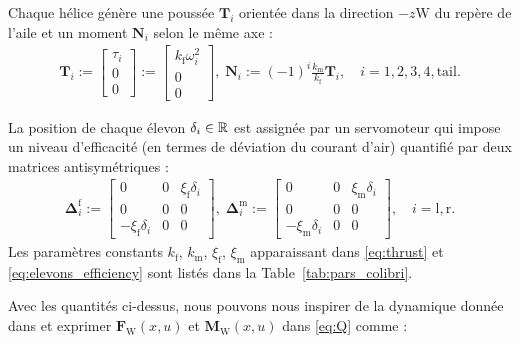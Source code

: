 Chaque hélice génère une poussée $\boldsymbol{T}_i$ orientée dans la direction $-z{\text{W}}$ du repère de l'aile et un moment $\boldsymbol{N}_i$ selon le même axe :
\begin{align}
\label{eq:thrustcolibri}
\boldsymbol{T}_{i} \!:=\! \begin{bmatrix} \tau_{i} \\ 0 \\ 0 \end{bmatrix} \!:=\!
\begin{bmatrix} k_{\text{f}}\omega_{i}^{2} \\ 0 \\ 0 \end{bmatrix}\! , \;
\boldsymbol{N}_{i} \!:=\! (-1)^{i}  \frac{k_{\text{m}} }{k_{\text{f}}}\boldsymbol{T}_{i}, \quad i=1,2,3,4,\text{tail} .
\end{align}  

La position de chaque élevon $\delta_i \in {\mathbb R}$ est assignée par un servomoteur qui impose un niveau d'efficacité (en termes de déviation du courant d'air) quantifié par deux matrices antisymétriques :
\begin{align}
\label{eq:elevons_efficiency_colibri}
    \boldsymbol{\Delta}^{\text{f}}_{i} \!:=\! \begin{bmatrix} 0 & 0 & \xi_{\text{f}}\delta_{i} \\ 0 & 0 & 0 \\ -\xi_{\text{f}}\delta_{i} & 0 & 0 \end{bmatrix}\! ,\;
    \boldsymbol{\Delta}^{\text{m}}_{i} \!:=\! \begin{bmatrix} 0 & 0 & \xi_{\text{m}}\delta_{i} \\ 0 & 0 & 0 \\ -\xi_{\text{m}}\delta_{i} & 0 & 0 \end{bmatrix} \!, \quad i=\text{l},\text{r}.
\end{align}
 Les paramètres constants $k_{\text{f}}$, $k_{\text{m}}$, $\xi_{\text{f}}$, $\xi_{\text{m}}$ apparaissant dans \eqref{eq:thrust} et \eqref{eq:elevons_efficiency} sont listés dans la Table~\ref{tab:pars_colibri}.


Avec les quantités ci-dessus, nous pouvons nous inspirer de la dynamique donnée dans  \cite[eqns (97),~(98)]{lustosaHal-03035938} et exprimer $\boldsymbol{F}_{\text{W}}(x,u)$ et $\boldsymbol{M}_{\text{W}}(x,u)$ dans \eqref{eq:Q} comme :

